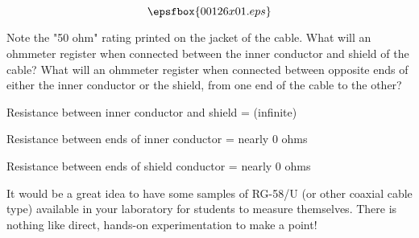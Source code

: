 

$$\epsfbox{00126x01.eps}$$

Note the "50 ohm" rating printed on the jacket of the cable.  What will an ohmmeter register when connected between the inner conductor and shield of the cable?  What will an ohmmeter register when connected between opposite ends of either the inner conductor or the shield, from one end of the cable to the other?







Resistance between inner conductor and shield = (infinite)

Resistance between ends of inner conductor = nearly 0 ohms

Resistance between ends of shield conductor = nearly 0 ohms







It would be a great idea to have some samples of RG-58/U (or other coaxial cable type) available in your laboratory for students to measure themselves.  There is nothing like direct, hands-on experimentation to make a point!




